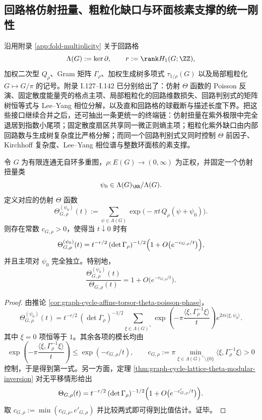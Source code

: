 \subsection{回路格仿射扭量、粗粒化缺口与环面核素支撑的统一刚性}\label{subsec:conclusion-cyclelattice-affine-uv-coarsegraining-torsion-coding-rigidity}

沿用附录 \ref{app:fold-multiplicity} 关于回路格
\[
\Lambda(G):=\ker\partial,
\qquad
r:=\rank H_1(G;\ZZ),
\]
加权二次型 \(Q_\rho\)、Gram 矩阵 \(\Gamma_\rho\)、加权生成树多项式 \(\tau_{1/\rho}(G)\) 以及局部粗粒化 \(G\mapsto G/\pi\) 的记号。附录 I.127--I.142 已分别给出了：仿射 \(\Theta\) 函数的 Poisson 反演、固定散度能量壳的格点主项、局部粗粒化的回路维数损失、回路判别式的矩阵树恒等式与 Lee--Yang 相位分解，以及直和回路格的球截断与描述长度下界。把这些接口继续合并之后，还可抽出一条更统一的终端链：仿射扭量在紫外极限中完全退居到指数小尾项；固定散度扇区共享同一微正则熵主项；粗粒化紫外缺口由内部回路数与生成树复杂度比严格分解；而同一个回路判别式又同时控制 \(\Theta\) 前因子、Kirchhoff 复杂度、Lee--Yang 相位谱与整数环面核的素支撑。

\begin{theorem}[回路格仿射扭量的紫外相位失明]\label{thm:conclusion-cyclelattice-affine-torsor-uv-blindness}
令 \(G\) 为有限连通无自环多重图，\(\rho:E(G)\to(0,\infty)\) 为正权，并固定一个仿射扭量类
\[
\psi_0\in \Lambda(G)_\RR/\Lambda(G).
\]
定义对应的仿射 \(\Theta\) 函数
\[
\Theta_{G,\rho}^{(\psi_0)}(t)
:=
\sum_{\psi\in \Lambda(G)}
\exp\!\bigl(-\pi t\,Q_\rho(\psi+\psi_0)\bigr).
\]
则存在常数 \(c_{G,\rho}>0\)，使得当 \(t\downarrow 0\) 时有
\[
\Theta_{G,\rho}^{(\psi_0)}(t)
=
t^{-r/2}\,(\det\Gamma_\rho)^{-1/2}\Bigl(1+O\bigl(e^{-c_{G,\rho}/t}\bigr)\Bigr),
\]
并且主项对 \(\psi_0\) 完全独立。特别地，
\[
\frac{\Theta_{G,\rho}^{(\psi_0)}(t)}{\Theta_{G,\rho}(t)}
=
1+O\bigl(e^{-c_{G,\rho}/t}\bigr).
\]
\end{theorem}
\begin{proof}
由推论 \ref{cor:graph-cycle-affine-torsor-theta-poisson-phase}，
\[
\Theta_{G,\rho}^{(\psi_0)}(t)
=
t^{-r/2}\,(\det\Gamma_\rho)^{-1/2}
\sum_{\xi\in\Lambda(G)^\vee}
\exp\!\left(-\pi\frac{\langle \xi,\Gamma_\rho^{-1}\xi\rangle}{t}\right)
e^{2\pi i\langle \xi,\psi_0\rangle}.
\]
其中 \(\xi=0\) 项恒等于 \(1\)。其余各项的模长均由
\[
\exp\!\left(-\pi\frac{\langle \xi,\Gamma_\rho^{-1}\xi\rangle}{t}\right)
\le
\exp(-c_{G,\rho}/t),
\qquad
c_{G,\rho}:=
\pi\min_{\xi\in\Lambda(G)^\vee\setminus\{0\}}
\langle \xi,\Gamma_\rho^{-1}\xi\rangle
>0
\]
控制，于是得到第一式。另一方面，定理 \ref{thm:graph-cycle-lattice-theta-modular-inversion} 对无平移情形给出
\[
\Theta_{G,\rho}(t)
=
t^{-r/2}\,(\det\Gamma_\rho)^{-1/2}\Bigl(1+O\bigl(e^{-c'_{G,\rho}/t}\bigr)\Bigr).
\]
取 \(c_{G,\rho}:=\min(c_{G,\rho},c'_{G,\rho})\) 并比较两式即可得到比值估计。证毕。
\end{proof}

